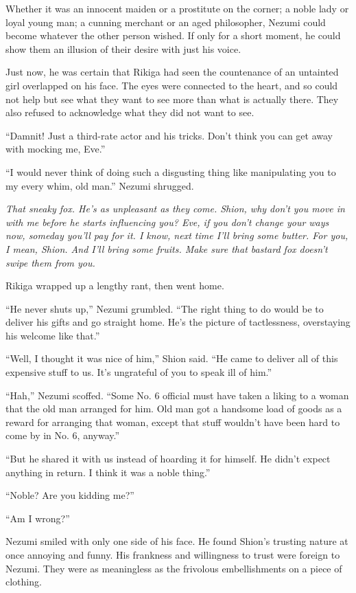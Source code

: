 Whether it was an innocent maiden or a prostitute on the corner; a noble
lady or loyal young man; a cunning merchant or an aged philosopher,
Nezumi could become whatever the other person wished. If only for a
short moment, he could show them an illusion of their desire with just
his voice.

Just now, he was certain that Rikiga had seen the countenance of an
untainted girl overlapped on his face. The eyes were connected to the
heart, and so could not help but see what they want to see more than
what is actually there. They also refused to acknowledge what they did
not want to see.

``Damnit! Just a third-rate actor and his tricks. Don't think you can
get away with mocking me, Eve.''

``I would never think of doing such a disgusting thing like manipulating
you to my every whim, old man.'' Nezumi shrugged.

\emph{That sneaky fox. He's as unpleasant as they come. Shion, why don't you
move in with me before he starts influencing you? Eve, if you don't
change your ways now, someday you'll pay for it. I know, next time I'll
bring some butter. For you, I mean, Shion. And I'll bring some fruits.
Make sure that bastard fox doesn't swipe them from you.}

Rikiga wrapped up a lengthy rant, then went home.

``He never shuts up,'' Nezumi grumbled. ``The right thing to do would be
to deliver his gifts and go straight home. He's the picture of
tactlessness, overstaying his welcome like that.''

``Well, I thought it was nice of him,'' Shion said. ``He came to deliver
all of this expensive stuff to us. It's ungrateful of you to speak ill
of him.''

``Hah,'' Nezumi scoffed. ``Some No. 6 official must have taken a liking
to a woman that the old man arranged for him. Old man got a handsome
load of goods as a reward for arranging that woman, except that stuff
wouldn't have been hard to come by in No. 6, anyway.''

``But he shared it with us instead of hoarding it for himself. He didn't
expect anything in return. I think it was a noble thing.''

``Noble? Are you kidding me?''

``Am I wrong?''

Nezumi smiled with only one side of his face. He found Shion's trusting
nature at once annoying and funny. His frankness and willingness to
trust were foreign to Nezumi. They were as meaningless as the frivolous
embellishments on a piece of clothing.

